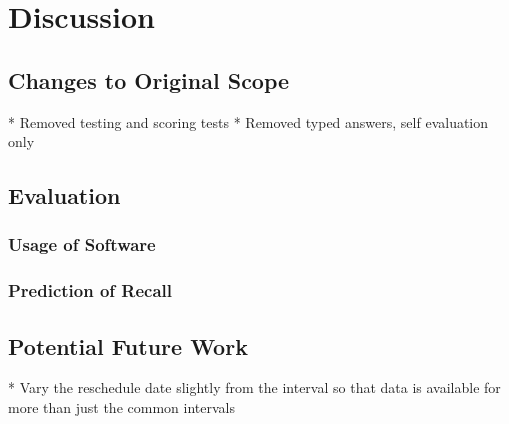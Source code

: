 \chapter{Discussion}
\section{Changes to Original Scope}
* Removed testing and scoring tests
* Removed typed answers, self evaluation only
\section{Evaluation}
\subsection{Usage of Software}
\subsection{Prediction of Recall}
\section{Potential Future Work}
* Vary the reschedule date slightly from the interval so that data is available for more
than just the common intervals